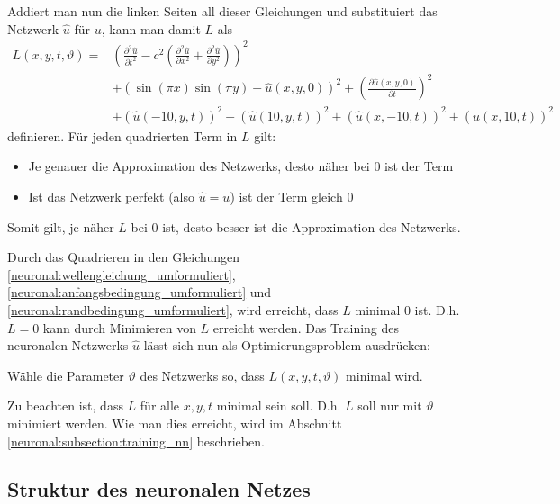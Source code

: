 Addiert man nun die linken Seiten all dieser Gleichungen und substituiert das Netzwerk \( \hat{u} \) für \( u \), kann man damit \( L \) als
\begin{equation}
    \begin{aligned}
        L(x, y, t, \vartheta) = &\left(\frac{\partial^2 \hat{u}}{\partial t^2} - c^2 \left( \frac{\partial^2 \hat{u}}{\partial x^2} + \frac{\partial^2 \hat{u}}{\partial y^2} \right)\right)^2\\
        &+ \left(\sin(\pi x) \sin(\pi y) - \hat{u}(x, y, 0)\right)^2
        + \left(\frac{\partial \hat{u}(x, y, 0)}{\partial t}\right)^2\\
        &+ \left(\hat{u}(-10, y, t)\right)^2
        + \left(\hat{u}(10, y, t)\right)^2
        + \left(\hat{u}(x, -10, t)\right)^2
        + \left(\hat{u}(x, 10, t)\right)^2
    \end{aligned}
    \label{neuronal:optimierung}
\end{equation}
definieren.
Für jeden quadrierten Term in \( L \) gilt:
\begin{itemize}
    \item Je genauer die Approximation des Netzwerks, desto näher bei 0 ist der Term
    \item Ist das Netzwerk perfekt (also \( \hat{u} = u \)) ist der Term gleich 0
\end{itemize}
Somit gilt, je näher \( L \) bei 0 ist, desto besser ist die Approximation des Netzwerks.

Durch das Quadrieren in den Gleichungen \eqref{neuronal:wellengleichung_umformuliert}, \eqref{neuronal:anfangsbedingung_umformuliert} und \eqref{neuronal:randbedingung_umformuliert}, wird erreicht, dass \( L \) minimal 0 ist.
D.h. \( L = 0 \) kann durch Minimieren von \( L \) erreicht werden.
Das Training des neuronalen Netzwerks \( \hat{u} \) lässt sich nun als Optimierungsproblem ausdrücken:
\begin{aufgabe}
Wähle die Parameter \( \vartheta \) des Netzwerks so, dass \( L(x, y, t, \vartheta) \) minimal wird.
\end{aufgabe}

Zu beachten ist, dass \( L \) für alle \( x, y, t \) minimal sein soll.
D.h. \( L \) soll nur mit \( \vartheta \) minimiert werden.
Wie man dies erreicht, wird im Abschnitt \ref{neuronal:subsection:training_nn} beschrieben.

\subsection{Struktur des neuronalen Netzes}\label{neuronal:subsection:struktur_nn}

